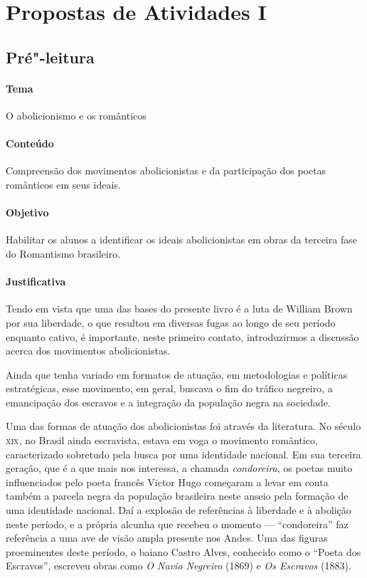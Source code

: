 \documentclass[12pt]{extarticle}
\begin{document}

\section{Propostas de Atividades I}

\subsection{Pré"-leitura}

\paragraph{Tema} O abolicionismo e os românticos

\paragraph{Conteúdo} Compreensão dos movimentos abolicionistas e da
participação dos poetas românticos em seus ideais.

\paragraph{Objetivo} Habilitar os alunos a identificar os ideais
abolicionistas em obras da terceira fase do Romantismo brasileiro.

\paragraph{Justificativa} Tendo em vista que uma das bases do presente
livro é a luta de William Brown por sua liberdade, o que resultou em diversas
fugas ao longo de seu período enquanto cativo, é importante, neste primeiro
contato, introduzirmos a discussão acerca dos movimentos abolicionistas.

Ainda que tenha variado em formatos de atuação, em
metodologias e políticas estratégicas, esse movimento, em geral, buscava
o fim do tráfico negreiro, a emancipação dos escravos e a integração da
população negra na sociedade. 

Uma das formas de atuação dos abolicionistas foi através
da literatura. No século \textsc{xix}, no Brasil ainda escravista,
estava em voga o movimento romântico, caracterizado sobretudo pela busca 
por uma identidade nacional. Em sua terceira geração, que é a que mais nos
interessa, a chamada
\emph{condoreira}, os poetas muito influenciados pelo poeta francês Victor Hugo
começaram a levar em conta também a parcela negra da população brasileira
neste anseio pela formação de uma identidade nacional. Daí a explosão 
de referências à liberdade e à abolição neste período, e a própria
alcunha que recebeu o momento --- ``condoreira'' faz referência a 
uma ave de visão ampla presente nos Andes. Uma das figuras proeminentes 
deste período, o baiano Castro Alves, conhecido como o ``Poeta 
dos Escravos'', escreveu obras como \emph{O Navio Negreiro} (1869) e 
\emph{Os Escravos} (1883).
\end{document}
